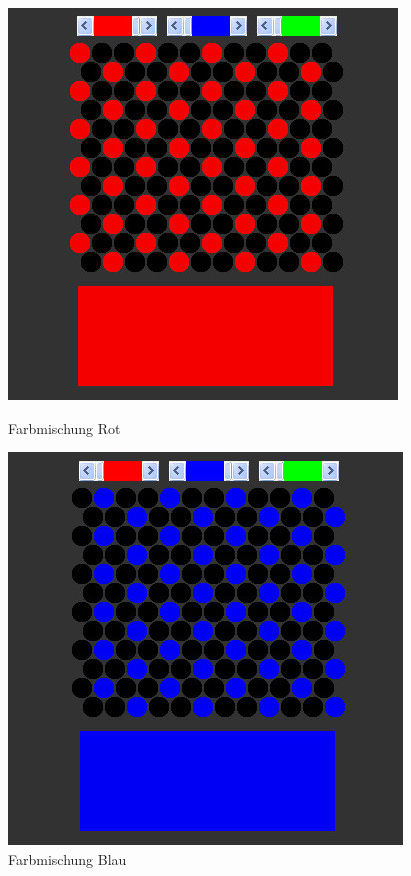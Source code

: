 \documentclass[a4paper]{article}
\begin{document}
\begin{figure}[H]
    \centering
    \begin{minipage}[b]{0.45\textwidth}
    	\includegraphics[width=0.9\columnwidth]{images/A3_rot.jpg}
    	\centering
    	\caption{Farbmischung Rot}
    	\label{fig:a3_rot}
    \end{minipage}
    \hfill
    \begin{minipage}[b]{0.45\textwidth}
    	\includegraphics[width=0.9\columnwidth]{images/A3_blau.jpg}
    	\centering
    	\caption{Farbmischung Blau}
    	\label{fig:a3_blau}
    \end{minipage}
\end{figure}
\end{document}
